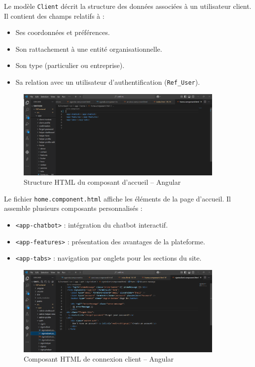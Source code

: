 \noindent
Le modèle \texttt{Client} décrit la structure des données associées à un utilisateur client. Il contient des champs relatifs à :
\begin{itemize}
    \item Ses coordonnées et préférences.
    \item Son rattachement à une entité organisationnelle.
    \item Son type (particulier ou entreprise).
    \item Sa relation avec un utilisateur d’authentification (\texttt{Ref\_User}).
\end{itemize}

\vspace{0.5cm}

\begin{figure}[H]
    \centering
    \includegraphics[width=0.9\textwidth]{figures/home comp.png}
    \caption{Structure HTML du composant d’accueil – Angular}
\end{figure}

\noindent
Le fichier \texttt{home.component.html} affiche les éléments de la page d’accueil. Il assemble plusieurs composants personnalisés :
\begin{itemize}
    \item \texttt{<app-chatbot>} : intégration du chatbot interactif.
    \item \texttt{<app-features>} : présentation des avantages de la plateforme.
    \item \texttt{<app-tabs>} : navigation par onglets pour les sections du site.
\end{itemize}

\vspace{0.5cm}

\begin{figure}[H]
    \centering
    \includegraphics[width=0.9\textwidth]{figures/main.png}
    \caption{Composant HTML de connexion client – Angular}
\end{figure}

